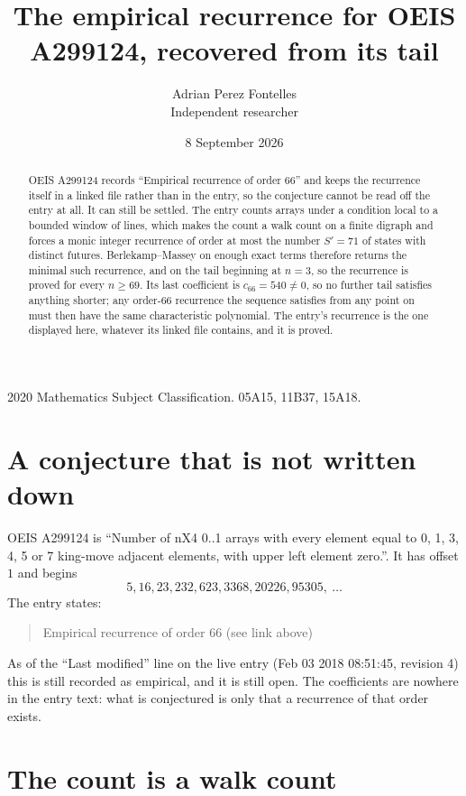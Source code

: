 \documentclass[11pt,a4paper]{article}
\title{The empirical recurrence for OEIS A299124, recovered from its tail}
\author{Adrian Perez Fontelles\\ \small Independent researcher}
\date{8 September 2026}
\theoremstyle{plain}
\theoremstyle{definition}
\begin{document}
\maketitle

\begin{abstract}
OEIS A299124 records ``Empirical recurrence of order $66$'' and keeps the recurrence itself in
a linked file rather than in the entry, so the conjecture cannot be read off the entry at all.
It can still be settled. The entry counts arrays under a condition local to a bounded window of
lines, which makes the count a walk count on a finite digraph and forces a monic integer
recurrence of order at most the number $S'=71$ of states with distinct futures. Berlekamp--Massey on
enough exact terms therefore returns the minimal such recurrence, and on the tail beginning at $n=3$, so the recurrence is proved for every $n\ge69$.
Its last coefficient is $c_{66}=540\neq0$, so no further tail satisfies anything
shorter; any order-$66$ recurrence the sequence satisfies from any point on must then have
the same characteristic polynomial. The entry's recurrence is the one displayed here, whatever
its linked file contains, and it is proved.
\end{abstract}

\noindent\small 2020 Mathematics Subject Classification. 05A15, 11B37, 15A18.\normalsize

\section{A conjecture that is not written down}

OEIS A299124 is ``Number of nX4 0..1 arrays with every element equal to 0, 1, 3, 4, 5 or 7 king-move adjacent elements, with upper left element zero.''. It has offset $1$ and begins
\[
5, 16, 23, 232, 623, 3368, 20226, 95305,\ \dots
\]
The entry states:
\begin{quote}
Empirical recurrence of order 66 (see link above)
\end{quote}
As of the ``Last modified'' line on the live entry (Feb 03 2018 08:51:45, revision 4)
this is still recorded as empirical, and it is still open. The coefficients are nowhere in the
entry text: what is conjectured is only that a recurrence of that order exists.

\section{The count is a walk count}
\end{document}
